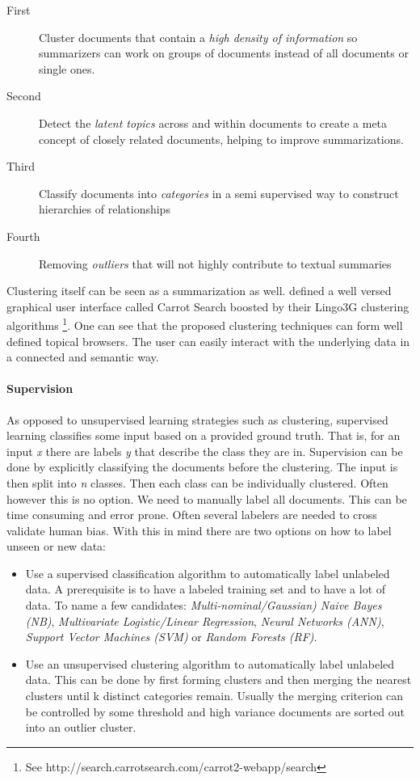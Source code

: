   \begin{description}
    \item[First] Cluster documents that contain a \emph{high density of information} so summarizers can work on groups of documents instead of all documents or single ones.
    \item[Second] Detect the \emph{latent topics} across and within documents to create a meta concept of closely related documents, helping to improve summarizations.
    \item[Third] Classify documents into \emph{categories} in a semi supervised way to construct hierarchies of relationships
    \item[Fourth] Removing \emph{outliers} that will not highly contribute to textual summaries
  \end{description}

  Clustering itself can be seen as a summarization as well. \cite{Carrot2Search2003} defined a well versed graphical user interface called Carrot Search boosted by their Lingo3G clustering algorithms \footnote{See http://search.carrotsearch.com/carrot2-webapp/search}. One can see that the proposed clustering techniques can form well defined topical browsers. The user can easily interact with the underlying data in a connected and semantic way.

  \paragraph{Supervision}
    As opposed to unsupervised learning strategies such as clustering, supervised learning classifies some input based on a provided ground truth. That is, for an input \emph{x} there are labels \emph{y} that describe the class they are in. Supervision can be done by explicitly classifying the documents before the clustering. The input is then split into \emph{n} classes. Then each class can be individually clustered. Often however this is no option. We need to manually label all documents. This can be time consuming and error prone. Often several labelers are needed to cross validate human bias.
    With this in mind there are two options on how to label unseen or new data:

      \begin{itemize}
        \item Use a supervised classification algorithm to automatically label unlabeled data. A prerequisite is to have a labeled training set and to have a lot of data. To name a few candidates: \emph{Multi-nominal/Gaussian) Naive Bayes (NB)}, \emph{Multivariate Logistic/Linear Regression}, \emph{Neural Networks (ANN)}, \emph{Support Vector Machines (SVM)} or \emph{Random Forests (RF)}. \cite{BishopML}
        \item Use an unsupervised clustering algorithm to automatically label unlabeled data. This can be done by first forming clusters and then merging the nearest clusters until k distinct categories remain. Usually the merging criterion can be controlled by some threshold and high variance documents are sorted out into an outlier cluster.
      \end{itemize}

